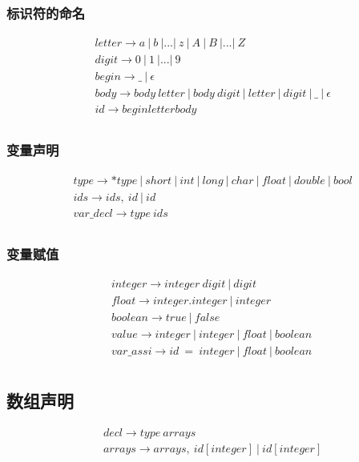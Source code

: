 \documentclass[lang=cn,11pt]{elegantpaper}
\begin{document}
	\subsubsection{标识符的命名}
	\begin{equation*}
		\begin{split}
			&letter \rightarrow a\ |\ b\ |...|\ z\ |\ A\ |\ B\ |...|\ Z \\
			&digit \rightarrow 0\ |\ 1\ |...|\ 9 \\
			&begin \rightarrow \_\ |\ \epsilon \\
			&body \rightarrow body\ letter\ |\ body\ digit\ |\ letter\ |\ digit\ |\ \_\ |\ \epsilon \\
			&id \rightarrow beginletterbody \\
		\end{split}
	\end{equation*}
	\subsubsection{变量声明}
	\begin{equation*}
		\begin{split}
		&type \rightarrow *type\ |\ short\ |\ int\ |\ long\ |\ char\ |\ float\ |\ double\ |\ bool \\
		&ids \rightarrow ids,\ id\ |\ id \\
		&var\_decl \rightarrow type\ ids \\
		\end{split}	
	\end{equation*}
	\subsubsection{变量赋值}
	\begin{equation*}
		\begin{split}
			&integer \rightarrow integer\ digit\ |\ digit \\
			&float \rightarrow integer.integer\ |\ integer \\
			&boolean \rightarrow true\ |\ false\ \\
			&value \rightarrow integer\ |\ integer\ |\ float\ |\ boolean \\
			&var\_assi \rightarrow id\ =\ integer\ |\ float\ |\ boolean\ \\
		\end{split}
	\end{equation*}
	\subsection{数组声明}
	\begin{equation*}
		\begin{split}
			&decl \rightarrow type\ arrays \\
			&arrays \rightarrow arrays,\ id[integer]\ |\ id[integer] \\
		\end{split}
	\end{equation*}
\end{document}

